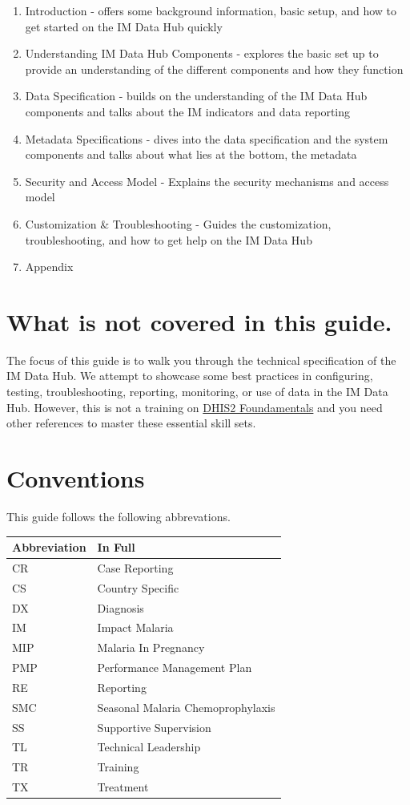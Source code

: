 \documentclass[]{book}
\providecommand{\tightlist}{%
  \setlength{\itemsep}{0pt}\setlength{\parskip}{0pt}}
\begin{document}
\begin{enumerate}
\def\labelenumi{\arabic{enumi}.}
\tightlist
\item
  Introduction - offers some background information, basic setup, and how to get started on the IM Data Hub quickly
\item
  Understanding IM Data Hub Components - explores the basic set up to provide an understanding of the different components and how they function
\item
  Data Specification - builds on the understanding of the IM Data Hub components and talks about the IM indicators and data reporting
\item
  Metadata Specifications - dives into the data specification and the system components and talks about what lies at the bottom, the metadata
\item
  Security and Access Model - Explains the security mechanisms and access model
\item
  Customization \& Troubleshooting - Guides the customization, troubleshooting, and how to get help on the IM Data Hub
\item
  Appendix
\end{enumerate}

\hypertarget{what-is-not-covered-in-this-guide.}{%
\section{What is not covered in this guide.}\label{what-is-not-covered-in-this-guide.}}

The focus of this guide is to walk you through the technical specification of the IM Data Hub. We attempt to showcase some best practices in configuring, testing, troubleshooting, reporting, monitoring, or use of data in the IM Data Hub. However, this is not a training on \href{https://academy.dhis2.org/courses/HISP/DHIS2_Level1/2015_Q1/about}{DHIS2 Foundamentals} and you need other references to master these essential skill sets.

\hypertarget{conventions}{%
\section{Conventions}\label{conventions}}

This guide follows the following abbrevations.

\begin{longtable}[]{@{}ll@{}}
\toprule
Abbreviation & In Full\tabularnewline
\midrule
\endhead
CR & Case Reporting\tabularnewline
CS & Country Specific\tabularnewline
DX & Diagnosis\tabularnewline
IM & Impact Malaria\tabularnewline
MIP & Malaria In Pregnancy\tabularnewline
PMP & Performance Management Plan\tabularnewline
RE & Reporting\tabularnewline
SMC & Seasonal Malaria Chemoprophylaxis\tabularnewline
SS & Supportive Supervision\tabularnewline
TL & Technical Leadership\tabularnewline
TR & Training\tabularnewline
TX & Treatment\tabularnewline
\bottomrule
\end{longtable}
\end{document}
